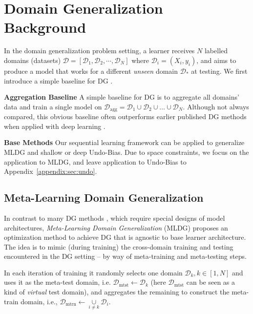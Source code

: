 \documentclass[runningheads]{llncs}
\newcommand{\cut}[1]{}
\newcommand{\keypoint}[1]{\vspace{0.1cm}\noindent\textbf{#1}\quad}
\begin{document}
\section{Domain Generalization Background}\label{sec:bg}
In the domain generalization problem setting, a learner receives $N$ labelled domains (datasets) $\mathcal{D}=[\mathcal{D}_1, \mathcal{D}_2, \cdots, \mathcal{D}_N]$ where $\mathcal{D}_i = (X_i, y_i)$, and aims to produce a model that works for a different \emph{unseen} domain $\mathcal{D}_*$ at testing. \cut{It assumes that the domains are homogeneous (containing corresponding input channels and label spaces).} We first introduce a simple baseline for DG .

\keypoint{Aggregation Baseline} A simple baseline for DG is to aggregate all domains' data and train a single model on $\mathcal{D}_{\text{agg}}=\mathcal{D}_1\cup\mathcal{D}_2\cup\dots\cup\mathcal{D}_N$. Although not always compared, this obvious baseline often outperforms earlier published DG methods when applied with deep learning \cite{da2017dg}.

\keypoint{Base Methods} Our sequential learning framework can be applied to generalize MLDG \cite{Li2018MLDG} and shallow \cite{ECCV12_Khosla} or deep \cite{da2017dg} Undo-Bias. Due to space constraints, we focus on the application to MLDG, and leave application to Undo-Bias to Appendix~\ref{appendix:sec:undo}. 

\subsection{Meta-Learning Domain Generalization}\label{sec:mldg}
In contrast to many DG methods \cite{ECCV12_Khosla,da2017dg,mmdaaecvpr2018,shiv2018dg}, which require special designs of model architectures, \emph{Meta-Learning Domain Generalization} (MLDG) \cite{Li2018MLDG} proposes an optimization method to achieve DG that is agnostic to base learner architecture. The idea is to mimic (during training) the cross-domain training and testing encountered in the DG setting -- by way of meta-training and meta-testing steps. 

In each iteration of training it randomly selects one domain $\mathcal{D}_{k}, k \in [1, N]$ and uses it as the meta-test domain, i.e. $\mathcal{D}_{\text{mtst}}\leftarrow \mathcal{D}_{k}$ (here $\mathcal{D}_{\text{mtst}}$ can be seen as a kind of \emph{virtual} test domain), and aggregates the remaining to construct the meta-train domain, i.e., $\mathcal{D}_{\text{mtrn}}\leftarrow\underset{i\neq k}{\cup} \mathcal{D}_i$.
\end{document}
